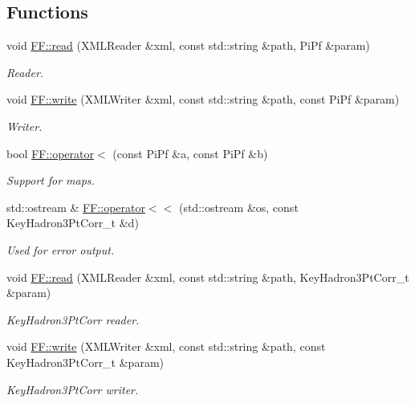 \subsection*{Functions}
\begin{DoxyCompactItemize}
\item 
void \mbox{\hyperlink{namespaceFF_ab0ac23f91d1403059f1df825a7ab775f}{F\+F\+::read}} (X\+M\+L\+Reader \&xml, const std\+::string \&path, Pi\+Pf \&param)
\begin{DoxyCompactList}\small\item\em Reader. \end{DoxyCompactList}\item 
void \mbox{\hyperlink{namespaceFF_a5f456c76a7fdfa1dd9305ebda8793354}{F\+F\+::write}} (X\+M\+L\+Writer \&xml, const std\+::string \&path, const Pi\+Pf \&param)
\begin{DoxyCompactList}\small\item\em Writer. \end{DoxyCompactList}\item 
bool \mbox{\hyperlink{namespaceFF_ab2fad4623f8e931f162863b3dbff7a29}{F\+F\+::operator$<$}} (const Pi\+Pf \&a, const Pi\+Pf \&b)
\begin{DoxyCompactList}\small\item\em Support for maps. \end{DoxyCompactList}\item 
std\+::ostream \& \mbox{\hyperlink{namespaceFF_aec2159c099eb8feb14ba92b783ce7493}{F\+F\+::operator$<$$<$}} (std\+::ostream \&os, const Key\+Hadron3\+Pt\+Corr\+\_\+t \&d)
\begin{DoxyCompactList}\small\item\em Used for error output. \end{DoxyCompactList}\item 
void \mbox{\hyperlink{namespaceFF_a457d1bd921b678eadc34fb2dbfcbdb32}{F\+F\+::read}} (X\+M\+L\+Reader \&xml, const std\+::string \&path, Key\+Hadron3\+Pt\+Corr\+\_\+t \&param)
\begin{DoxyCompactList}\small\item\em Key\+Hadron3\+Pt\+Corr reader. \end{DoxyCompactList}\item 
void \mbox{\hyperlink{namespaceFF_a9e6eed897710dbad982d5a699a70f857}{F\+F\+::write}} (X\+M\+L\+Writer \&xml, const std\+::string \&path, const Key\+Hadron3\+Pt\+Corr\+\_\+t \&param)
\begin{DoxyCompactList}\small\item\em Key\+Hadron3\+Pt\+Corr writer. \end{DoxyCompactList}\item 

\end{DoxyCompactItemize}
